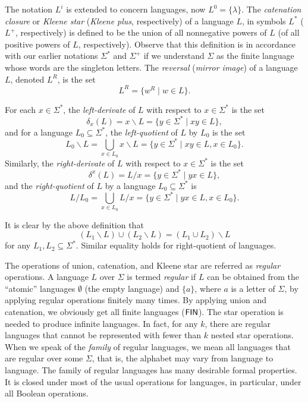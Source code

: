 The notation $L^i$ is extended to concern languages, now $L^0 = \{\lambda\}$. The \emph{catenation closure} or  \emph{Kleene star} (\emph{Kleene plus}, respectively) of a language $L$, in symbols $L^*$ ($L^+$, respectively) is defined to be the union of all nonnegative powers of $L$ (of all positive powers of $L$, respectively). Observe that this definition is in accordance with our earlier notations $\Sigma^*$ and $\Sigma^+$ if we understand $\Sigma$ as the finite language whose words are the singleton letters. The \emph{reversal} (\emph{mirror image}) of a language $L$, denoted $L^R$, is the set
$$L^R = \{w^R \mid w \in L\}.$$

For each $x \in \Sigma^*$, the \emph{left-derivate} of $L$ with respect to $x \in \Sigma^*$ is the set
$$\delta_x(L) = x \backslash L = \{y \in \Sigma^* \mid xy \in L\},$$
and for a language $L_0 \subseteq \Sigma^*$, the \emph{left-quotient} of $L$ by $L_0$ is the set
$$L_0 \backslash L = \bigcup_{x \in L_0} x \backslash L = \{y \in \Sigma^* \mid xy \in L, x \in L_0\}.$$
Similarly, the \emph{right-derivate} of $L$ with respect to $x \in \Sigma^*$ is the set
$$\delta^x(L) = L / x = \{y \in \Sigma^* \mid yx \in L\},$$
and the \emph{right-quotient} of $L$ by a language $L_0 \subseteq \Sigma^*$ is
$$L / L_0 = \bigcup_{x \in L_0} L / x = \{y \in \Sigma^* \mid yx \in L, x \in L_0\}.$$

It is clear by the above definition that
$$(L_1 \backslash L) \cup (L_2 \backslash L) = (L_1 \cup L_2) \backslash L$$
for any $L_1, L_2 \subseteq \Sigma^*$. Similar equality holds for right-quotient of languages.


The operations of union, catenation, and Kleene star are referred as \emph{regular} operations. A language $L$ over $\Sigma$ is termed \emph{regular} if $L$ can be obtained from the ``atomic'' languages $\emptyset$ (the  empty language) and $\{a\}$, where $a$ is a letter of $\Sigma$, by applying regular operations finitely many times. By applying union and catenation, we obviously get all finite languages \index{$\Fin$}($\Fin$). The star operation is needed to produce infinite languages. In fact, for any $k$, there are regular languages that cannot be represented with fewer than $k$ nested star operations. When we speak of the \emph{family} of regular languages, we mean all languages that are regular over some $\Sigma$, that is, the alphabet may vary from language to language. The family of regular languages has many desirable formal properties. It is closed under most of the usual operations for languages, in particular, under all Boolean operations.

